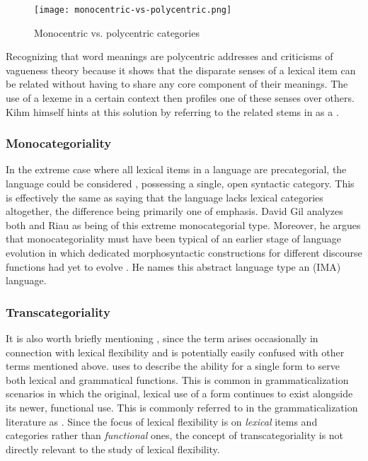 \begin{figure}[h!]
  \centering
  \texttt{[image: monocentric-vs-polycentric.png]}
  \caption{Monocentric vs. polycentric categories}
  \label{fig:monocentric-vs-polycentric}
\end{figure}

Recognizing that word meanings are polycentric addresses  and  criticisms of vagueness theory because it shows that the disparate senses of a lexical item can be related without having to share any core component of their meanings. The use of a lexeme in a certain context then profiles one of these senses over others. Kihm himself hints at this solution by referring to the related  stems in  as a .

\subsubsection{Monocategoriality}
\label{sec:2.3.1.5}

In the extreme case where all lexical items in a language are precategorial, the language could be considered , possessing a single, open syntactic category. This is effectively the same as saying that the language lacks lexical categories altogether, the difference being primarily one of emphasis. David Gil analyzes both  \parencite*{Gil1995} and Riau  \parencite*{Gil1994} as being of this extreme monocategorial type. Moreover, he argues that monocategoriality must have been typical of an earlier stage of language evolution in which dedicated morphosyntactic constructions for different discourse functions had yet to evolve \parencites{Gil2005}{Gil2006}{Gil2012}. He names this abstract language type an  (IMA) language.

\subsubsection{Transcategoriality}
\label{sec:2.3.1.6}

It is also worth briefly mentioning , since the term arises occasionally in connection with lexical flexibility and is potentially easily confused with other terms mentioned above. \textcite{Robert2003} uses  to describe the ability for a single form to serve both lexical and grammatical functions. This is common in grammaticalization scenarios in which the original, lexical use of a form continues to exist alongside its newer, functional use. This is commonly referred to in the grammaticalization literature as  \parencite[118]{HopperTraugott2003}. Since the focus of lexical flexibility is on \emph{lexical} items and categories rather than \emph{functional} ones, the concept of transcategoriality is not directly relevant to the study of lexical flexibility.

